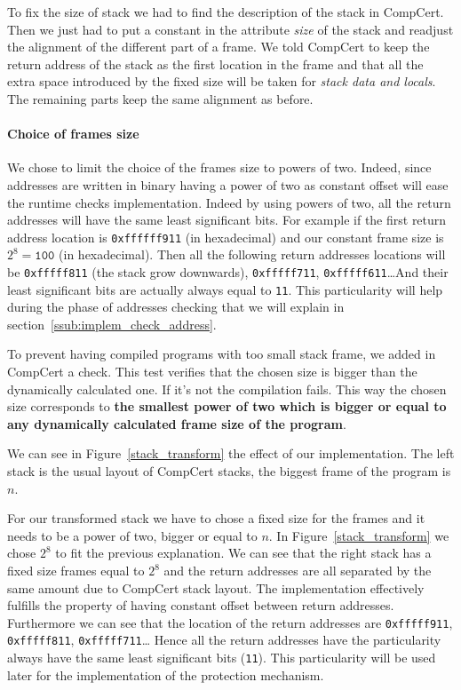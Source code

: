 \documentclass[11pt]{sdm}
\begin{document}
To fix the size of stack we had to find the description of the stack in CompCert. Then we just had to put a constant in the attribute \textit{size} of the stack and readjust the alignment of the different part of a frame. We told CompCert to keep the return address of the stack as the first location in the frame and that all the extra space introduced by the fixed size will be taken for  \textit{stack data and locals}. The remaining parts keep the same alignment as before.

\paragraph{Choice of frames size}
\label{par:Choice of frames size}

We chose to limit the choice of the frames size to powers of two. Indeed, since addresses are written in binary having a power of two as constant offset will ease the runtime checks implementation. Indeed by using powers of two, all the return addresses will have the same least significant bits. For example if the first return address location is \texttt{0xffffff911} (in hexadecimal) and our constant frame size is $2^8 = \texttt{100}$ (in hexadecimal). Then all the following return addresses locations will be \texttt{0xfffff811} (the stack grow downwards), \texttt{0xfffff711}, \texttt{0xfffff611}\dots And their least significant bits are actually always equal to \texttt{11}. This particularity will help during the phase of addresses checking that we will explain in section~\ref{ssub:implem_check_address}.

To prevent having compiled programs with too small stack frame, we added in CompCert a check. This test verifies that the chosen size is bigger than the dynamically calculated one. If it's not the compilation fails. This way the chosen size corresponds to \textbf{the smallest power of two which is bigger or equal to any dynamically calculated frame size of the program}.

We can see in Figure~\ref{stack_transform} the effect of our implementation. 
The left stack is the usual layout of CompCert stacks, the biggest frame of the program is $n$.

For our transformed stack we have to chose a fixed size for the frames and it needs to be a power of two, bigger or equal to $n$. In Figure~\ref{stack_transform} we chose $2^8$ to fit the previous explanation.
We can see that the right stack has a fixed size frames equal to $2^8$ and the return addresses are all separated by the same amount due to CompCert stack layout.
The implementation effectively fulfills the property of having constant offset between return addresses.
Furthermore we can see that the location of the return addresses are \texttt{0xfffff911}, \texttt{0xfffff811}, \texttt{0xfffff711}\dots
Hence all the return addresses have the particularity always have the same least significant bits (\texttt{11}). This particularity will be used later for the implementation of the protection mechanism.
\end{document}
